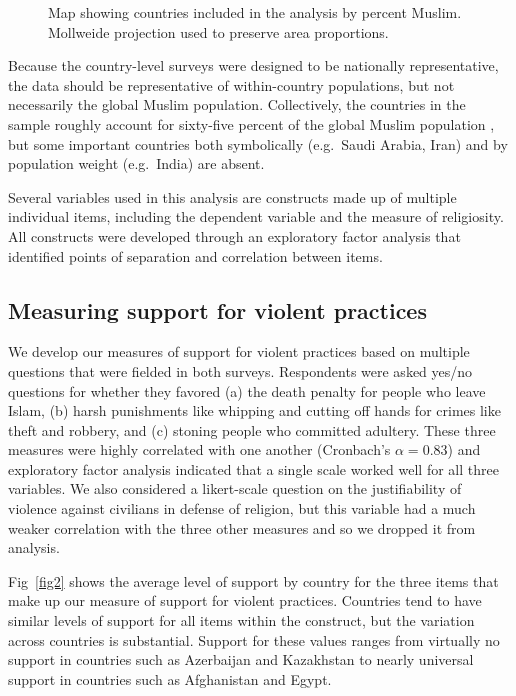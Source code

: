 \documentclass[10pt,letterpaper]{article}
\begin{document}
\begin{figure}[!h]
\centering
\caption{Map showing countries included in the analysis by percent
Muslim. Mollweide projection used to preserve area proportions.}
\label{fig1}
\end{figure}

Because the country-level surveys were designed to be nationally
representative, the data should be representative of within-country
populations, but not necessarily the global Muslim population.
Collectively, the countries in the sample roughly account for sixty-five
percent of the global Muslim population
\cite{pewforumonreligionandpubliclife_global_2012}, but some important
countries both symbolically (e.g.~Saudi Arabia, Iran) and by population
weight (e.g.~India) are absent.

Several variables used in this analysis are constructs made up of
multiple individual items, including the dependent variable and the
measure of religiosity. All constructs were developed through an
exploratory factor analysis that identified points of separation and
correlation between items.

\subsection*{Measuring support for violent practices}

We develop our measures of support for violent practices based on
multiple questions that were fielded in both surveys. Respondents were
asked yes/no questions for whether they favored (a) the death penalty
for people who leave Islam, (b) harsh punishments like whipping and
cutting off hands for crimes like theft and robbery, and (c) stoning
people who committed adultery. These three measures were highly
correlated with one another (Cronbach's \(\alpha=0.83\)) and exploratory
factor analysis indicated that a single scale worked well for all three
variables. We also considered a likert-scale question on the
justifiability of violence against civilians in defense of religion, but
this variable had a much weaker correlation with the three other
measures and so we dropped it from analysis.

Fig~\ref{fig2} shows the average level of support by country for the three
items that make up our measure of support for violent practices.
Countries tend to have similar levels of support for all items within
the construct, but the variation across countries is substantial.
Support for these values ranges from virtually no support in countries
such as Azerbaijan and Kazakhstan to nearly universal support in
countries such as Afghanistan and Egypt.
\end{document}
